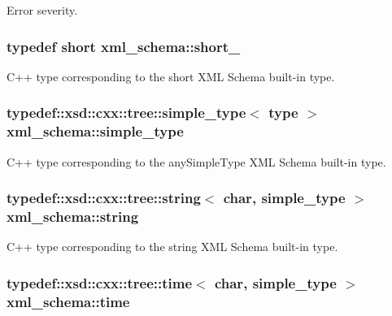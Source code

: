 Error severity. 

\hypertarget{namespacexml__schema_a705720c1fed1575ccdcfd21cb7ab39ab}{
\subsubsection[{short\-\_\-}]{\setlength{\rightskip}{0pt plus 5cm}typedef short {\bf xml\-\_\-schema\-::short\-\_\-}}}\label{namespacexml__schema_a705720c1fed1575ccdcfd21cb7ab39ab}


C++ type corresponding to the short X\-M\-L Schema built-\/in type. 

\hypertarget{namespacexml__schema_ab0835e08cd73a2d842f597be0bdecafc}{
\subsubsection[{simple\-\_\-type}]{\setlength{\rightskip}{0pt plus 5cm}typedef\-::xsd\-::cxx\-::tree\-::simple\-\_\-type$<$ {\bf type} $>$ {\bf xml\-\_\-schema\-::simple\-\_\-type}}}\label{namespacexml__schema_ab0835e08cd73a2d842f597be0bdecafc}


C++ type corresponding to the any\-Simple\-Type X\-M\-L Schema built-\/in type. 

\hypertarget{namespacexml__schema_ac0cec83a330f0024e4e318b3deac5104}{
\subsubsection[{string}]{\setlength{\rightskip}{0pt plus 5cm}typedef\-::xsd\-::cxx\-::tree\-::string$<$ char, {\bf simple\-\_\-type} $>$ {\bf xml\-\_\-schema\-::string}}}\label{namespacexml__schema_ac0cec83a330f0024e4e318b3deac5104}


C++ type corresponding to the string X\-M\-L Schema built-\/in type. 

\hypertarget{namespacexml__schema_a59aaa57bb5452c1f6c6111f1501277d4}{
\subsubsection[{time}]{\setlength{\rightskip}{0pt plus 5cm}typedef\-::xsd\-::cxx\-::tree\-::time$<$ char, {\bf simple\-\_\-type} $>$ {\bf xml\-\_\-schema\-::time}}}\label{namespacexml__schema_a59aaa57bb5452c1f6c6111f1501277d4}


